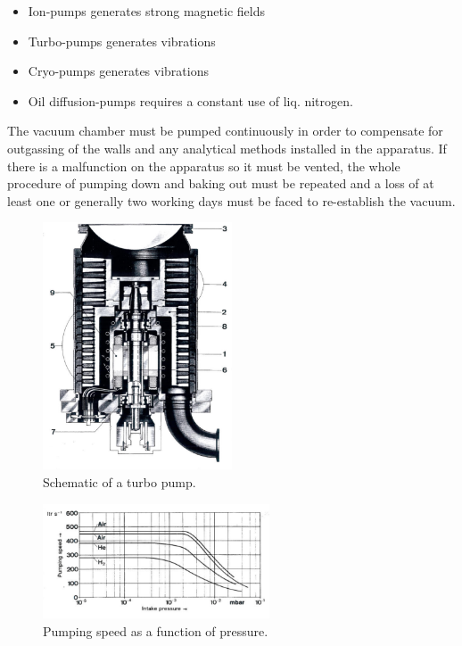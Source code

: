\begin{itemize} 
\item Ion-pumps \dotfill generates strong magnetic fields
\item Turbo-pumps \dotfill generates vibrations
\item Cryo-pumps \dotfill generates vibrations
\item Oil diffusion-pumps \dotfill requires a constant use of liq. nitrogen.
\end{itemize}

The vacuum chamber must be pumped continuously in order to compensate for outgassing of the walls and any analytical methods installed in the apparatus. If there is a malfunction on the apparatus so it must be vented, the whole procedure of pumping down and baking out must be repeated and a loss of at least one or generally two working days must be faced to re-establish the vacuum.

\begin{figure}[htbp]
\centering
\includegraphics[width=0.5\textwidth]{figures/02_01a}
\caption{Schematic of a turbo pump.}
\label{fig:turbo_pump}
\end{figure}

\begin{figure}[htbp]
\centering
\includegraphics[width=0.6\textwidth]{figures/02_01b}
\caption{Pumping speed as a function of pressure.}
\label{fig:pumping_speed}
\end{figure}

